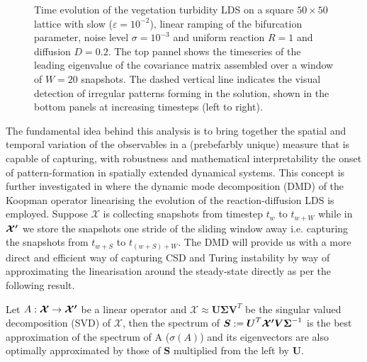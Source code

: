 \documentclass[../main.tex]{subfiles}
\begin{document}
\begin{figure}[H]
\begin{subfigure}[b]{0.11\textwidth}
    \end{subfigure}
    \caption{Time evolution of the vegetation turbidity LDS on a square $50\times50$ lattice with slow ($\varepsilon=10^{-2}$), linear ramping of the bifurcation parameter, noise level $\sigma=10^{-3}$ and uniform reaction $R=1$ and diffusion $D=0.2$.
The top pannel shows the timeseries of the leading eigenvalue of the covariance matrix assembled over a window of $W=20$ snapshots. 
The dashed vertical line indicates the visual detection of irregular patterns forming in the solution, shown in the bottom panels at increasing timesteps (left to right).}
    \label{fig3.8}
\end{figure}
The fundamental idea behind this analysis is to bring together the spatial and temporal variation of the observables in a (prebefarbly unique) measure that is capable of capturing, with robustness and mathematical interpretability the onset of pattern-formation in spatially extended dynamical systems.
This concept is further investigated in \cite{Donovan22} where the dynamic mode decomposition (DMD) of the Koopman operator linearising the evolution of the reaction-diffusion LDS is employed.
Suppose $\boldsymbol{\mathcal{X}}$ is collecting snapshots from timestep $t_{w}$ to $t_{w+W}$ while in $\boldsymbol{\mathcal{X'}}$ we store the snapshots one stride of the sliding window away i.e. capturing the snapshots from $t_{w+S}$ to $t_{(w+S)+W}$.
The DMD will provide us with a more direct and efficient way of capturing CSD and Turing instability by way of approximating the linearisation around the steady-state directly as per the following result.
\begin{theorem}[label=thm3.6]{}{}
     Let $A:\boldsymbol{\mathcal{X}}\to \boldsymbol{\mathcal{X'}}$ be a linear operator and $\boldsymbol{\mathcal{X}}\approx \boldsymbol{U}\boldsymbol{\Sigma}\boldsymbol{V}^{T}$ be the singular valued decomposition (SVD) of $\boldsymbol{\mathcal{X}}$, then the spectrum of $\boldsymbol{S}:= \boldsymbol{U}^{T}\boldsymbol{\mathcal{X'}}\boldsymbol{V}\boldsymbol{\Sigma}^{-1}$ is the best approximation of the spectrum of A ($\sigma(A)$) and its eigenvectors are also optimally approximated by those of $\boldsymbol{S}$ multiplied from the left by $\boldsymbol{U}$.
\end{theorem}
\end{document}
